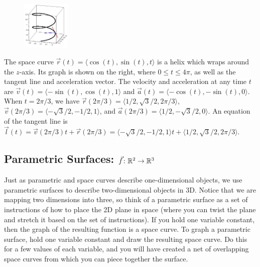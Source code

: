 \renewcommand{\mywidth}{0.9in}
\begin{figure}
\includegraphics[width=\mywidth]{functions/spacecurve-1}
\end{figure}
\examplebegin
The space curve {$\vec r(t)=\langle\cos(t),\sin(t),t\rangle$} is a
helix which wraps around the $z$-axis.  Its graph is shown on the
right, where $0\leq t\leq 4\pi$, as well as the tangent line and acceleration
vector. The velocity and acceleration at any time $t$ are $\vec v(t) =
\langle-\sin(t),\cos(t),1\rangle$ and $\vec a(t) =
\langle-\cos(t),-\sin(t),0\rangle$. When $t=2\pi/3$, we have $\vec
r(2\pi/3) = \langle1/2,\sqrt{3}/2,2\pi/3\rangle$, $\vec v(2\pi/3) =
\langle-\sqrt{3}/2,-1/2,1\rangle$, and $\vec a(2\pi/3) =
\langle1/2,-\sqrt{3}/2,0\rangle$. An equation of the tangent line is
$\vec l(t) = \vec v(2\pi/3)t+ \vec r(2\pi/3)=
\langle-\sqrt{3}/2,-1/2,1\rangle t+\langle1/2,\sqrt{3}/2,2\pi/3\rangle$.
\exampleend


\subsection{Parametric Surfaces: {$\vec f\colon {\ensuremath{\mathbb{R}}}^2\to {\ensuremath{\mathbb{R}}}^3$} }

Just as parametric and space curves describe one-dimensional objects, we use parametric surfaces to describe two-dimensional objects in 3D.  Notice that we are mapping two dimensions into three, so think of a parametric surface as a set of instructions of how to place the 2D plane in space (where you can twist the plane and stretch it based on the set of instructions).  If you hold one variable constant, then the graph of the resulting function is a space curve. To graph a parametric surface, hold one variable constant and draw the resulting space curve.  Do this for a few values of each variable, and you will have created a net of overlapping space curves from which you can piece together the surface.  

